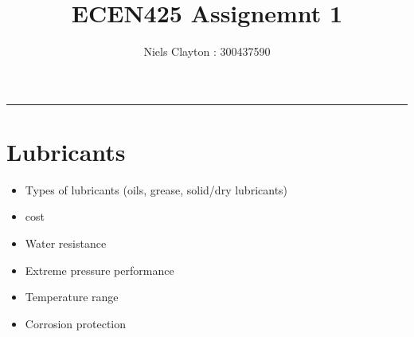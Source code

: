 \documentclass[a4paper,11pt]{article}
\begin{document}
\title{\LARGE{\textbf{ECEN425 Assignemnt 1}}}
\author{Niels Clayton : 300437590}
\date{}
\maketitle
\hrule

\section*{Lubricants}

\begin{itemize}
    \item Types of lubricants (oils, grease, solid/dry lubricants)
    \item cost 
    \item Water resistance
    \item Extreme pressure performance
    \item Temperature range
    \item Corrosion protection
\end{itemize}
\end{document}
